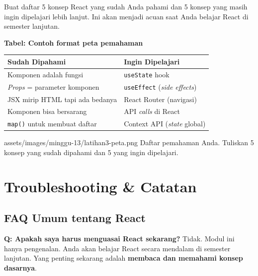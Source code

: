 \begin{latihan}
Buat daftar 5 konsep React yang sudah Anda pahami dan 5 konsep yang masih ingin dipelajari lebih lanjut. Ini akan menjadi acuan saat Anda belajar React di semester lanjutan.

\begin{center}
\textbf{Tabel: Contoh format peta pemahaman}
\medskip
\begin{tabular}{ll}
\toprule
\textbf{Sudah Dipahami} & \textbf{Ingin Dipelajari} \\
\midrule
Komponen adalah fungsi & \texttt{useState} hook \\
\emph{Props} = parameter komponen & \texttt{useEffect} (\emph{side effects}) \\
JSX mirip HTML tapi ada bedanya & React Router (navigasi) \\
Komponen bisa bersarang & API \emph{calls} di React \\
\texttt{map()} untuk membuat daftar & Context API (\emph{state} global) \\
\bottomrule
\end{tabular}
\end{center}

\begin{tangkapanlayar}
  {assets/images/minggu-13/latihan3-peta.png}
  {Daftar pemahaman Anda.}
  {Tuliskan 5 konsep yang sudah dipahami dan 5 yang ingin dipelajari.}
\end{tangkapanlayar}
\end{latihan}

\section{Troubleshooting \& Catatan}
\label{sec:13-troubleshooting}

\subsection{FAQ Umum tentang React}

\begin{catatan}
\textbf{Q: Apakah saya harus menguasai React sekarang?}
Tidak. Modul ini hanya pengenalan. Anda akan belajar React secara mendalam di semester lanjutan. Yang penting sekarang adalah \textbf{membaca dan memahami konsep dasarnya}.
\end{catatan}

